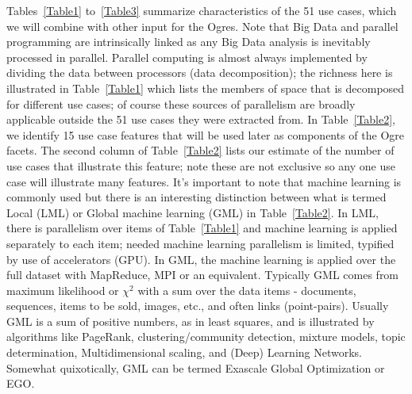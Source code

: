 \documentclass{acm_proc_article-sp}
\begin{document}
Tables~\ref{Table1} to~\ref{Table3} summarize characteristics of the 51 use cases, which we will combine with other input for the Ogres. Note that Big Data and parallel programming are intrinsically linked as any Big Data analysis is inevitably processed in parallel. Parallel computing is almost always implemented by dividing the data between processors (data decomposition); the richness here is illustrated in Table~\ref{Table1} which lists the members of space that is decomposed for different use cases; of course these sources of parallelism are broadly applicable outside the 51 use cases they were extracted from. In Table~\ref{Table2}, we identify 15 use case features that will be used later as components of the Ogre facets. The second column of Table~\ref{Table2} lists our estimate of the number of use cases that illustrate this feature; note these are not exclusive so any one use case will illustrate many features.
It's important to note that machine learning is commonly used but there is an interesting distinction between what is termed Local (LML) or Global machine learning (GML) in Table~\ref{Table2}. In LML, there is parallelism over items of Table~\ref{Table1} and machine learning is applied separately to each item; needed machine learning parallelism is limited, typified by use of accelerators (GPU). In GML, the machine learning is applied over the full dataset with MapReduce, MPI or an equivalent. Typically GML comes from maximum likelihood or $\chi^2$ with a sum over the data items - documents, sequences, items to be sold, images, etc., and often links (point-pairs). Usually GML is a sum of positive numbers, as in least squares, and is illustrated by algorithms like PageRank, clustering/community detection, mixture models, topic determination, Multidimensional scaling, and (Deep) Learning Networks. Somewhat quixotically, GML can be termed Exascale Global Optimization or EGO.
\end{document}
